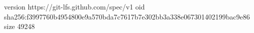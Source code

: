 version https://git-lfs.github.com/spec/v1
oid sha256:f3997760b4954800e9a570bda7c7617b7e302bb3a338e067301402199bac9e86
size 49248
